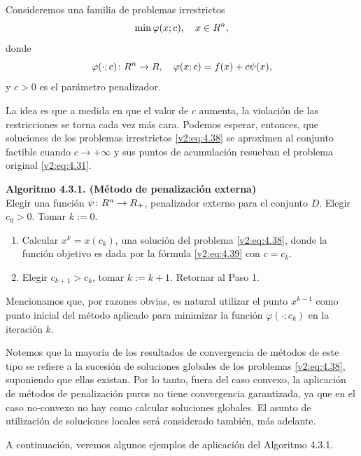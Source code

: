 Consideremos una familia de problemas irrestrictos
\begin{equation}
    \min \varphi(x; c), \quad x \in R^n,
    \label{v2:eq:4.38}
\end{equation}
donde
\begin{equation}
    \varphi(\cdot; c) \colon R^n \to R, \quad \varphi(x; c) = f(x) + c\psi(x),
    \label{v2:eq:4.39}
\end{equation}
y $c > 0$ es el parámetro penalizador.

La idea es que a medida en que el valor de $c$ aumenta, la violación de las restricciones se torna cada vez más cara. Podemos esperar, entonces, que soluciones de los problemas irrestrictos \eqref{v2:eq:4.38} se aproximen al conjunto factible cuando $c \to +\infty$ y sus puntos de acumulación resuelvan el problema original \eqref{v2:eq:4.31}.

\noindent \textbf{Algoritmo 4.3.1. (Método de penalización externa)} \\
Elegir una función $\psi \colon R^n \to R_+$, penalizador externo para el conjunto $D$. Elegir $c_0 > 0$. Tomar $k := 0$.
\begin{enumerate}
    \item Calcular $x^k = x(c_k)$, una solución del problema \eqref{v2:eq:4.38}, donde la función objetivo es dada por la fórmula \eqref{v2:eq:4.39} con $c = c_k$.
    \item Elegir $c_{k+1} > c_k$, tomar $k := k + 1$. Retornar al Paso 1.
\end{enumerate}

Mencionamos que, por razones obvias, es natural utilizar el punto $x^{k-1}$ como punto inicial del método aplicado para minimizar la función $\varphi(\cdot; c_k)$ en la iteración $k$.

Notemos que la mayoría de los resultados de convergencia de métodos de este tipo se refiere a la sucesión de soluciones globales de los problemas \eqref{v2:eq:4.38}, suponiendo que ellas existan. Por lo tanto, fuera del caso convexo, la aplicación de métodos de penalización puros no tiene convergencia garantizada, ya que en el caso no-convexo no hay como calcular soluciones globales. El asunto de utilización de soluciones locales será considerado también, más adelante.

A continuación, veremos algunos ejemplos de aplicación del Algoritmo 4.3.1.

